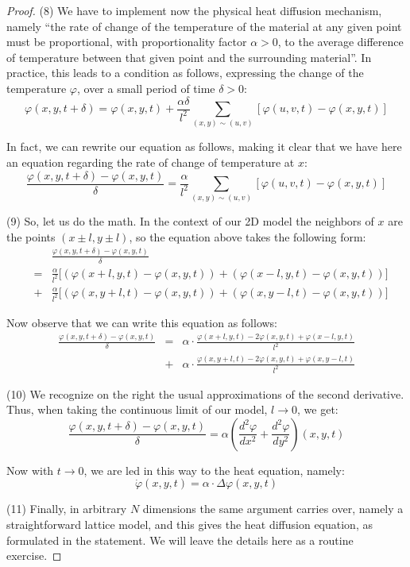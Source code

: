 \documentclass[12pt]{amsbook}
\begin{document}
\begin{proof}
(8) We have to implement now the physical heat diffusion mechanism, namely ``the rate of change of the temperature of the material at any given point must be proportional, with proportionality factor $\alpha>0$, to the average difference of temperature between that given point and the surrounding material''. In practice, this leads to a condition as follows, expressing the change of the temperature $\varphi$, over a small period of time $\delta>0$:
$$\varphi(x,y,t+\delta)=\varphi(x,y,t)+\frac{\alpha\delta}{l^2}\sum_{(x,y)\sim(u,v)}\left[\varphi(u,v,t)-\varphi(x,y,t)\right]$$

In fact, we can rewrite our equation as follows, making it clear that we have here an equation regarding the rate of change of temperature at $x$:
$$\frac{\varphi(x,y,t+\delta)-\varphi(x,y,t)}{\delta}=\frac{\alpha}{l^2}\sum_{(x,y)\sim(u,v)}\left[\varphi(u,v,t)-\varphi(x,y,t)\right]$$

(9) So, let us do the math. In the context of our 2D model the neighbors of $x$ are the points $(x\pm l,y\pm l)$, so the equation above takes the following form:
\begin{eqnarray*}
&&\frac{\varphi(x,y,t+\delta)-\varphi(x,y,t)}{\delta}\\
&=&\frac{\alpha}{l^2}\Big[(\varphi(x+l,y,t)-\varphi(x,y,t))+(\varphi(x-l,y,t)-\varphi(x,y,t))\Big]\\
&+&\frac{\alpha}{l^2}\Big[(\varphi(x,y+l,t)-\varphi(x,y,t))+(\varphi(x,y-l,t)-\varphi(x,y,t))\Big]
\end{eqnarray*}

Now observe that we can write this equation as follows:
\begin{eqnarray*}
\frac{\varphi(x,y,t+\delta)-\varphi(x,y,t)}{\delta}
&=&\alpha\cdot\frac{\varphi(x+l,y,t)-2\varphi(x,y,t)+\varphi(x-l,y,t)}{l^2}\\
&+&\alpha\cdot\frac{\varphi(x,y+l,t)-2\varphi(x,y,t)+\varphi(x,y-l,t)}{l^2}
\end{eqnarray*}

(10) We recognize on the right the usual approximations of the second derivative. Thus, when taking the continuous limit of our model, $l\to 0$, we get:
$$\frac{\varphi(x,y,t+\delta)-\varphi(x,y,t)}{\delta}
=\alpha\left(\frac{d^2\varphi}{dx^2}+\frac{d^2\varphi}{dy^2}\right)(x,y,t)$$

Now with $t\to0$, we are led in this way to the heat equation, namely:
$$\dot{\varphi}(x,y,t)=\alpha\cdot\Delta\varphi(x,y,t)$$

(11) Finally, in arbitrary $N$ dimensions the same argument carries over, namely a straightforward lattice model, and this gives the heat diffusion equation, as formulated in the statement. We will leave the details here as a routine exercise.
\end{proof}
\end{document}
